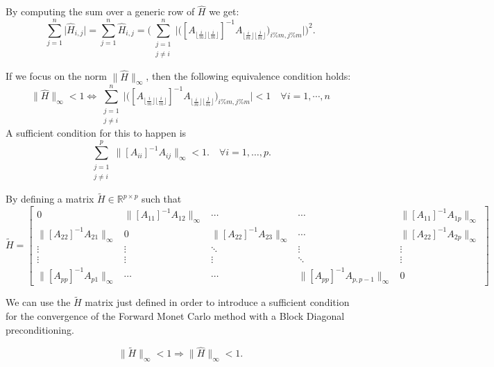 By computing the sum over a generic row of $\hat{H}$ we get:
\[
 \sum_{j=1}^n \lvert \hat{H}_{i,j}\rvert=\sum_{j=1}^n \hat{H}_{i,j} =
 \bigg ( \sum_{\substack{j=1\\j\ne i}}^n\bigg \lvert \bigg ([A_{\lfloor
\frac{i}{m}\rfloor \lfloor
\frac{i}{m}\rfloor}]^{-1} A_{\lfloor \frac{i}{m}\rfloor \lfloor
\frac{j}{m}\rfloor}\bigg )_{i\%m,j\%m}\bigg \rvert \bigg ) ^2.
\]

If we focus on the norm $\lVert \hat{H}\rVert_{\infty}$, then the following
equivalence condition holds:
\[
 \lVert \hat{H}\rVert_{\infty}<1 \Leftrightarrow \sum_{\substack{j=1\\j\ne
i}}^n\bigg \lvert \bigg ([A_{\lfloor
\frac{i}{m}\rfloor \lfloor
\frac{i}{m}\rfloor}]^{-1} A_{\lfloor \frac{i}{m}\rfloor \lfloor
\frac{j}{m}\rfloor}\bigg )_{i\%m,j\%m}\bigg \rvert <1 \quad \forall
i=1,\cdots,n
\]
 A sufficient condition for this to happen is
 \begin{equation}
  \sum_{\substack{j=1\\j\ne i}}^p \lVert [A_{ii}]^{-1}A_{ij}\rVert_{\infty}<1.
    \label{block_cs}\quad \forall i=1,\ldots,p.
 \end{equation}

By defining a matrix $\tilde{H}\in \mathbb{R}^{p\times p}$ such that
\[
 \tilde{H}=\begin{bmatrix}0 & \lVert [A_{11}]^{-1}A_{12}\rVert_{\infty} &
\cdots &
\cdots & \lVert [A_{11}]^{-1}A_{1p}\rVert_{\infty} \\
\lVert [A_{22}]^{-1}A_{21}\rVert_{\infty} & 0 & \lVert
[A_{22}]^{-1}A_{23}\rVert_{\infty} &
\cdots & \lVert [A_{22}]^{-1}A_{2p}\rVert_{\infty} \\
\vdots & \vdots & \ddots & \vdots & \vdots\\
\vdots & \vdots & \vdots &\ddots & \vdots \\
\lVert [A_{pp}]^{-1}A_{p1}\rVert_{\infty} &  \cdots & \cdots&
\lVert [A_{pp}]^{-1}A_{p,p-1}\rVert_{\infty} & 0
\end{bmatrix}
\]

We can use the $\tilde{H}$ matrix just defined in order to introduce a
sufficient condition for the convergence of the Forward Monet Carlo method with
a Block Diagonal preconditioning.

\begin{equation}
 \lVert \tilde{H} \rVert_{\infty}<1 \Rightarrow \lVert \hat{H}
\rVert_{\infty}<1.
\end{equation}

